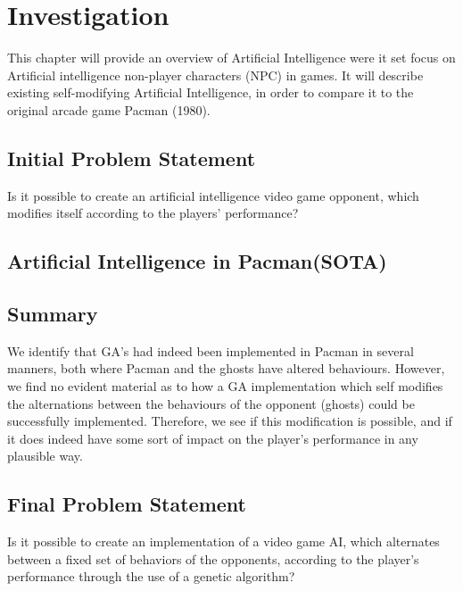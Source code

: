 
\section{Investigation} \label{sec:preanalysus}
This chapter will provide an overview of Artificial Intelligence were it set focus on Artificial intelligence non-player characters (NPC) in games. It will describe existing self-modifying Artificial Intelligence, in order to compare it to the original arcade game Pacman (1980).


\subsection{Initial Problem Statement} \label{sec:initialproblemstatement}
Is it possible to create an artificial intelligence video game opponent, which modifies itself according to the players' performance?



\subsection{Artificial Intelligence in Pacman(SOTA)}



\subsection{Summary}
We identify that GA’s had indeed been implemented in Pacman in several manners, both where Pacman and the ghosts have altered behaviours. However, we find no evident material as to how a GA implementation which self modifies the alternations between the behaviours of the opponent (ghosts) could be successfully implemented. Therefore, we see if this modification is possible, and if it does indeed have some sort of impact on the player’s performance in any plausible way.


\subsection{Final Problem Statement} \label{sec:finalproblemstatement}
Is it possible to create an implementation of a video game AI, which alternates between a fixed set of behaviors of the opponents, according to the player's performance through the use of a genetic algorithm?
